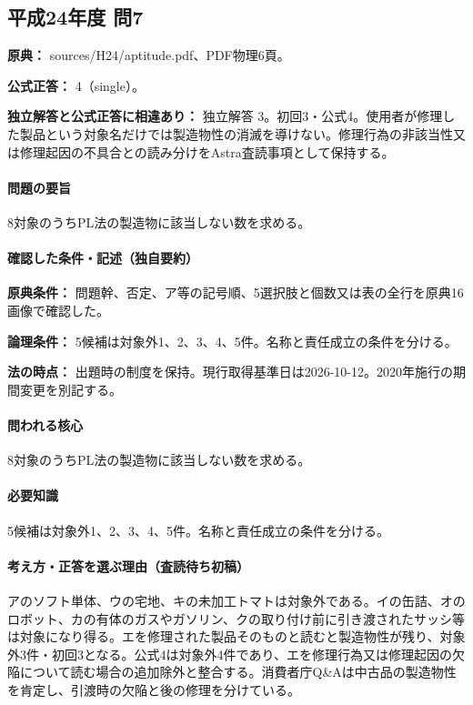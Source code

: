 \subsection{平成24年度 問7}
\label{q:h24-reg-apt-07}

\noindent\textbf{原典：} sources/H24/aptitude.pdf、PDF物理6頁。

\textbf{公式正答：} 4（single）。

\par\textbf{独立解答と公式正答に相違あり：} 独立解答 3。初回3・公式4。使用者が修理した製品という対象名だけでは製造物性の消滅を導けない。修理行為の非該当性又は修理起因の不具合との読み分けをAstra査読事項として保持する。

\paragraph{問題の要旨} 8対象のうちPL法の製造物に該当しない数を求める。

\paragraph{確認した条件・記述（独自要約）}\mbox{}\par

\noindent\textbf{原典条件：} 問題幹、否定、ア等の記号順、5選択肢と個数又は表の全行を原典16画像で確認した。\par

\noindent\textbf{論理条件：} 5候補は対象外1、2、3、4、5件。名称と責任成立の条件を分ける。\par

\noindent\textbf{法の時点：} 出題時の制度を保持。現行取得基準日は2026-10-12。2020年施行の期間変更を別記する。\par

\paragraph{問われる核心} 8対象のうちPL法の製造物に該当しない数を求める。

\paragraph{必要知識} 5候補は対象外1、2、3、4、5件。名称と責任成立の条件を分ける。

\paragraph{考え方・正答を選ぶ理由（査読待ち初稿）} アのソフト単体、ウの宅地、キの未加工トマトは対象外である。イの缶詰、オのロボット、カの有体のガスやガソリン、クの取り付け前に引き渡されたサッシ等は対象になり得る。エを修理された製品そのものと読むと製造物性が残り、対象外3件・初回3となる。公式4は対象外4件であり、エを修理行為又は修理起因の欠陥について読む場合の追加除外と整合する。消費者庁Q\&Aは中古品の製造物性を肯定し、引渡時の欠陥と後の修理を分けている。

